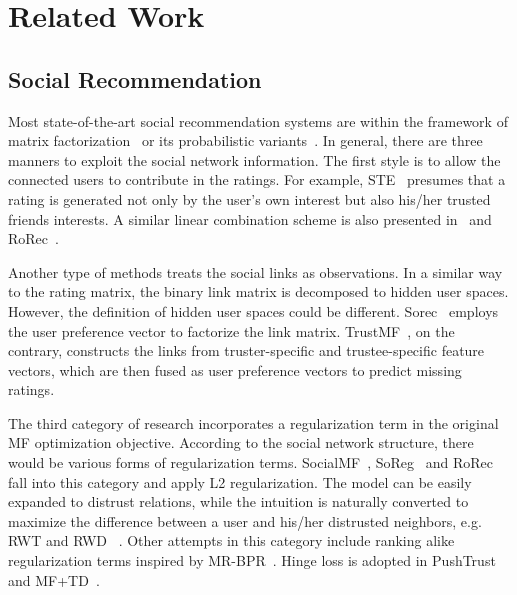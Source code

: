 \documentclass{ieeeaccess}
\begin{document}
\section{Related Work}\label{sec:relatedwork}

\subsection{Social Recommendation}
Most state-of-the-art social recommendation systems are within the framework of matrix factorization~\cite{Koren2009Matrix} or its probabilistic variants~\cite{salakhutdinov2008probabilistic}. In general, there are three manners to exploit the social network information. The first style is to allow the connected users to contribute in the ratings. For example, STE~\cite{ma2009learning} presumes that a rating is generated not only by the user's own interest but also his/her trusted friends interests. A similar linear combination scheme is also presented in~\cite{AuYeung2011Strength} and RoRec~\cite{Yao2014Modeling}.

Another type of methods treats the social links as observations. In a similar way to the rating matrix, the binary link matrix is decomposed to hidden user spaces. However, the definition of hidden user spaces could be different. Sorec~\cite{ma2008sorec} employs the user preference vector to factorize the link matrix. TrustMF~\cite{Yang2013Social}, on the contrary, constructs the links from truster-specific and trustee-specific feature vectors, which are then fused as user preference vectors to predict missing ratings.

The third category of research incorporates a regularization term in the original MF optimization objective. According to the social network structure, there would be various forms of regularization terms. SocialMF~\cite{Jamali2010matrix}, SoReg~\cite{Ma2011Recommender} and RoRec~\cite{Yao2014Modeling} fall into this category and apply L2 regularization. The model can be easily expanded to distrust relations, while the intuition is naturally converted to maximize the difference between a user and his/her distrusted neighbors, e.g. RWT and RWD ~\cite{Ma2009Learninga}. Other attempts in this category include ranking alike regularization terms inspired by MR-BPR~\cite{Krohn-Grimberghe2012Multi}. Hinge loss is adopted in PushTrust~\cite{Forsati2015PushTrust} and MF+TD~\cite{Forsati2014Matrix}.
\end{document}
